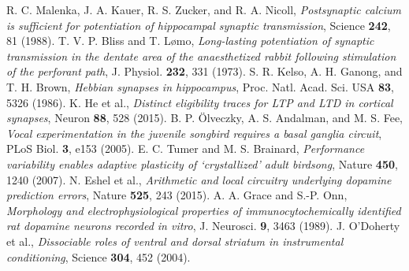  R. C. Malenka, J. A. Kauer, R. S. Zucker, and R. A. Nicoll, \emph{Postsynaptic calcium is sufficient for potentiation of hippocampal synaptic transmission}, Science \textbf{242}, 81 (1988).
 T. V. P. Bliss and T. L{\o}mo, \emph{Long-lasting potentiation of synaptic transmission in the dentate area of the anaesthetized rabbit following stimulation of the perforant path}, J. Physiol. \textbf{232}, 331 (1973).
 S. R. Kelso, A. H. Ganong, and T. H. Brown, \emph{Hebbian synapses in hippocampus}, Proc. Natl. Acad. Sci. USA \textbf{83}, 5326 (1986).
 K. He et al., \emph{Distinct eligibility traces for LTP and LTD in cortical synapses}, Neuron \textbf{88}, 528 (2015).
 B. P. \"Olveczky, A. S. Andalman, and M. S. Fee, \emph{Vocal experimentation in the juvenile songbird requires a basal ganglia circuit}, PLoS Biol. \textbf{3}, e153 (2005).
 E. C. Tumer and M. S. Brainard, \emph{Performance variability enables adaptive plasticity of `crystallized' adult birdsong}, Nature \textbf{450}, 1240 (2007).
 N. Eshel et al., \emph{Arithmetic and local circuitry underlying dopamine prediction errors}, Nature \textbf{525}, 243 (2015).
 A. A. Grace and S.-P. Onn, \emph{Morphology and electrophysiological properties of immunocytochemically identified rat dopamine neurons recorded in vitro}, J. Neurosci. \textbf{9}, 3463 (1989).
 J. O'Doherty et al., \emph{Dissociable roles of ventral and dorsal striatum in instrumental conditioning}, Science \textbf{304}, 452 (2004).
